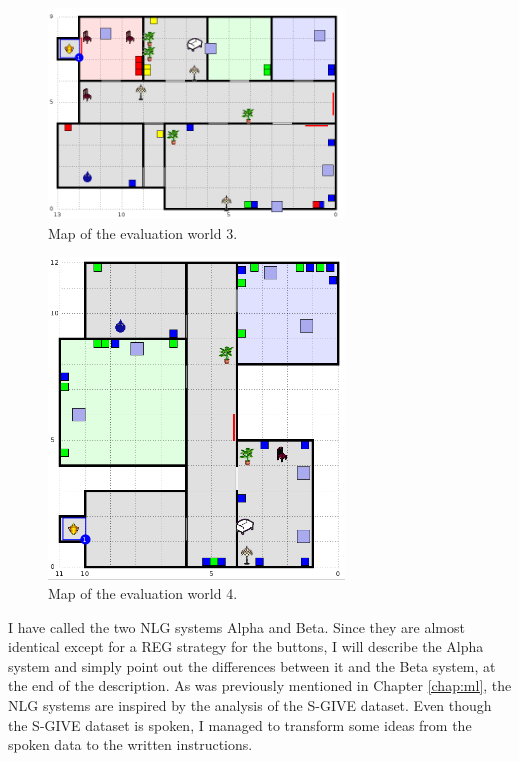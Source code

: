 \begin{figure}[!htbp]
  \centering
	\includegraphics[width=0.7\textwidth]{Images/experiment-world-4}
	\caption{Map of the evaluation world 3.}
	\label{fig:exper-world3}
\end{figure}

\begin{figure}[!htbp]
  \centering
	\includegraphics[width=0.7\textwidth]{Images/experiment-world-5}
	\caption{Map of the evaluation world 4.}
	\label{fig:exper-world4}
\end{figure}

I have called the two NLG systems Alpha and Beta. Since they are almost identical except for a REG strategy for the buttons, I will describe the Alpha system and simply point out the differences between it and the Beta system, at the end of the description. As was previously mentioned in Chapter \ref{chap:ml}, the NLG systems are inspired by the analysis of the S-GIVE dataset. Even though the S-GIVE dataset is spoken, I managed to transform some ideas from the spoken data to the written instructions.

